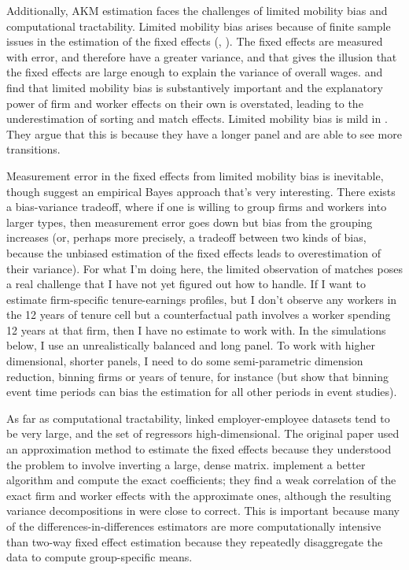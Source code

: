 \documentclass{article}
\begin{document}
Additionally, AKM estimation faces the challenges of limited mobility bias and computational tractability. Limited mobility bias arises because of finite sample issues in the estimation of the fixed effects (\citealp{andrews2008high}, \citealp{andrews2012high}). The fixed effects are measured with error, and therefore have a greater variance, and that gives the illusion that the fixed effects are large enough to explain the variance of overall wages. \citet{kline2020leave} and \citet{bonhomme2022much} find that limited mobility bias is substantively important and the explanatory power of firm and worker effects on their own is overstated, leading to the underestimation of sorting and match effects. Limited mobility bias is mild in \citet{lachowska2020firm}. They argue that this is because they have a longer panel and are able to see more transitions.

Measurement error in the fixed effects from limited mobility bias is inevitable, though \citet{bonhomme2022much} suggest an empirical Bayes approach that's very interesting. There exists a bias-variance tradeoff, where if one is willing to group firms and workers into larger types, then measurement error goes down but bias from the grouping increases (or, perhaps more precisely, a tradeoff between two kinds of bias, because the unbiased estimation of the fixed effects leads to overestimation of their variance). For what I'm doing here, the limited observation of matches poses a real challenge that I have not yet figured out how to handle. If I want to estimate firm-specific tenure-earnings profiles, but I don't observe any workers in the 12 years of tenure cell but a counterfactual path involves a worker spending 12 years at that firm, then I have no estimate to work with. In the simulations below, I use an unrealistically balanced and long panel. To work with higher dimensional, shorter panels, I need to do some semi-parametric dimension reduction, binning firms or years of tenure, for instance (but \citet{sun2021estimating} show that binning event time periods can bias the estimation for all other periods in event studies).

As far as computational tractability, linked employer-employee datasets tend to be very large, and the set of regressors high-dimensional. The original \citet{abowd1999high} paper used an approximation method to estimate the fixed effects because they understood the problem to involve inverting a large, dense matrix. \citet{abowd2002computing} implement a better algorithm and compute the exact coefficients; they find a weak correlation of the exact firm and worker effects with the approximate ones, although the resulting variance decompositions in \citet{abowd1999high} were close to correct. This is important because many of the differences-in-differences estimators are more computationally intensive than two-way fixed effect estimation because they repeatedly disaggregate the data to compute group-specific means.
\end{document}
